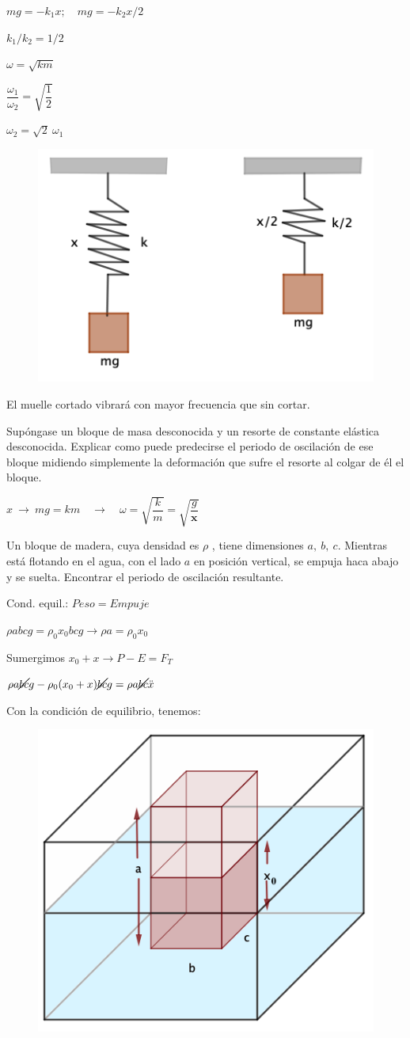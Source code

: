 \begin{multicols}{2}
$mg=-k_1x;\quad mg=-k_2x/2$

$k_1/k_2=1/2$

$\omega=\sqrt{k m}$

$\dfrac {\omega_1}{\omega_2}=\sqrt{\dfrac 1 2}$

$\omega_2=\sqrt{2}\ \omega_1$
\begin{figure}[H]
		\centering
		\includegraphics[width=.4\textwidth]{imagenes/imagenes21/T21IM07.png}
	\end{figure}	
\end{multicols}

El muelle cortado vibrará con mayor frecuencia que sin cortar.
\vspace{5mm} %
\begin{prob}
Supóngase un bloque de masa desconocida y un resorte de constante elástica desconocida. Explicar como puede predecirse el periodo	de oscilación de ese bloque midiendo simplemente la deformación que sufre el resorte al colgar de él el bloque.
\end{prob}

$x \ \to \ mg=km \quad \to \quad \omega=\sqrt{\dfrac k m}=\sqrt{\dfrac{g} {\boldsymbol{x}}}$
\vspace{5mm} %
\begin{prob}
Un bloque de madera, cuya densidad es $\rho$	, tiene dimensiones $a,\ b,\ c$. Mientras está flotando en el agua, con el lado $a$ en posición vertical, se empuja haca abajo y se suelta. Encontrar el periodo de oscilación resultante.
\end{prob}
\vspace{5mm} %
\begin{multicols}{2}
Cond. equil.: $Peso=Empuje$

$\rho abc g=\rho_0 x_0bcg \to \rho a=\rho_0 x_0$

Sumergimos $x_0+x \to P-E=F_T$

$\rho a \cancel{bc} g-\rho_0(x_0+x) \cancel{bc} g=\rho a \cancel{bc}\ddot{x}$

Con la condición de equilibrio, tenemos:

\begin{figure}[H]
		\centering
		\includegraphics[width=.3\textwidth]{imagenes/imagenes21/T21IM08.png}
	\end{figure}	
\end{multicols}

